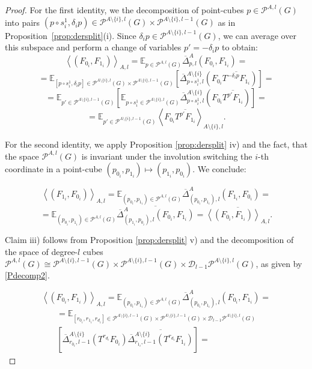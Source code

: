 \documentclass{amsart}
\theoremstyle{definition}
\theoremstyle{remark}
\numberwithin{equation}{section}
\begin{document}
\begin{proof} For the first identity, we the decomposition of point-cubes $p \in \mathcal{P}^{A,l}(G)$ into pairs
$(p \circ s_i^1, \delta_i p) \in \mathcal{P}^{A \setminus \{i\},l}(G) \times \mathcal{P}^{A \setminus \{i\},l-1}(G)$ as in Proposition~\ref{prop:dersplit}(i). Since $\delta_i p \in \mathcal{P}^{A\setminus\{i\},l-1}(G)$, we can average over this subspace and perform a change of variables $p' = -\delta_i p$ to obtain:
$$ \left\langle \left(F_{0_i}, F_{1_i}\right) \right\rangle_{A,l} =  \mathbb{E}_{p \in \mathcal{P}^{A,l}(G)} \overline{\Delta}^A_{p,l} \left(F_{0_i}, F_{1_i}\right)= $$ 
$$= \mathbb{E}_{[p \circ s_i^1   ,\delta_i p] \in \mathcal{P}^{A\setminus\{i\},l}(G) \times \mathcal{P}^{A\setminus\{i\},l-1}(G)}   \left[ \overline{\Delta}^{A \setminus \{i\}}_{p \circ s_i^1  ,l} \left( F_{0_i}\overline{T^{-\delta_i p}F_{1_i}}\right) \right] = 
$$
$$= \mathbb{E}_{p'  \in \mathcal{P}^{A\setminus\{i\},l-1}(G)} \left[ \mathbb{E}_{p \circ s_i^1   \in \mathcal{P}^{A\setminus\{i\},l}(G)}     \overline{\Delta}^{A \setminus \{i\}}_{p \circ s_i^1  ,l}  \left( F_{0_i}\overline{T^{p'}F_{1_i}}\right) \right] = $$
$$ = \mathbb{E}_{p'  \in \mathcal{P}^{A\setminus\{i\},l-1}(G)}  \left\langle F_{0_i}\overline{T^{p'}F_{1_i}} \right\rangle_{A\setminus \{i\},l} .$$

For the second identity, we apply Proposition \ref{prop:dersplit} iv) and the fact, that the space $\mathcal{P}^{A,l}(G)$ is invariant under the involution switching the $i$-th coordinate in a point-cube
$(p_{0_i},p_{1_i}) \mapsto (p_{1_i},p_{0_i})$. We conclude:

$$\left\langle  \left(F_{1_i}, F_{0_i}\right)  \right\rangle_{A,l} = \mathbb{E}_{(p_{0_i},p_{1_i}) \in \mathcal{P}^{A,l}(G)} \overline{\Delta}^A_{(p_{0_i},p_{1_i}),l}  \left(F_{1_i}, F_{0_i}\right)  = $$
$$ = \mathbb{E}_{(p_{0_i},p_{1_i}) \in \mathcal{P}^{A,l}(G)} \overline{\overline{\Delta}^A_{(p_{1_i},p_{0_i}),l}  \left(F_{0_i}, F_{1_i}\right)} = \overline{\left\langle \left(F_{0_i}, F_{1_i}\right) \right\rangle_{A,l}}.$$

Claim  iii) follows from Proposition \ref{prop:dersplit} v) and the decomposition of the space of  degree-$l$ cubes $\mathcal{P}^{A,l}(G) \cong  \mathcal{P}^{A\setminus \{i\},l-1}(G) \times \mathcal{P}^{A\setminus \{i\},l-1}(G) \times \mathcal{D}_{l-1}\mathcal{P}^{A \setminus \{i\},l}(G)$, as given by \eqref{Pdecomp2}.

$$ \left\langle \left(F_{0_i}, F_{1_i}\right) \right\rangle_{A,l} =  \mathbb{E}_{(p_{0_i}, p_{1_i}) \in \mathcal{P}^{A,l}(G)} \overline{\Delta}^A_{(p_{0_i}, p_{1_i}),l} \left(F_{0_i}, F_{1_i}\right)= $$ 
\begin{multline*}
= \mathbb{E}_{[r_{0_i},r_{1_i},r_{d_i}] \in  \mathcal{P}^{A\setminus \{i\},l-1}(G) \times \mathcal{P}^{A\setminus \{i\},l-1}(G) \times \mathcal{D}_{l-1}\mathcal{P}^{A \setminus \{i\},l}(G) } \\
\left[\overline{\Delta}^{A\setminus \{i\}}_{r_{0_i},l-1}\left( T^{r_{d_i}}F_{0_i}\right)  \overline{
\overline{\Delta}^{A\setminus \{i\}}_{r_{1_i},l-1}\left( T^{r_{d_i}}F_{1_i}\right)}\right] = \end{multline*}


\end{proof}
\end{document}
